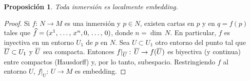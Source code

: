 \theoremstyle{plain}
\newtheorem{propoEquivalenciaEmbedding}{Proposici\'{o}n}[section]
\newtheorem{propoInmersionEsLocalmenteEmbedding}[propoEquivalenciaEmbedding]%
	{Proposici\'{o}n}
\newtheorem{propoEmbeddingEntornoTajada}[propoEquivalenciaEmbedding]%
	{Proposici\'{o}n}

\theoremstyle{remark}


\begin{propoInmersionEsLocalmenteEmbedding}%
	\label{propo:inmersioneslocalmenteembedding}
	Toda inmersi\'{o}n es localmente embedding.
\end{propoInmersionEsLocalmenteEmbedding}

\begin{proof}
	Si $f:\,N\rightarrow M$ es una inmersi\'{o}n y $p\in N$, existen cartas
	en $p$ y en $q=f(p)$ tales que
	$\encoordenadas{f}=(\lista*{x}{n},0,\,\dots,\,0)$, donde $n=\dim\,N$.
	En particular, $f$ es inyectiva en un entorno $U_1$ de $p$ en $N$. Sea
	$U\subset U_1$ otro entorno del punto tal que $\overline{U}\subset U_1$ y
	$\overline{U}$ sea compacta. Entonces
	$f|_{\overline{U}}:\,\overline{U}\rightarrow f(\overline{U})$ es biyectiva (y
	continua) entre compactos (Hausdorff) y, por lo tanto, subespacio.
	Restringiendo $f$ al entorno $U$, $f|_U:\,U\rightarrow M$ es embedding.
\end{proof}

